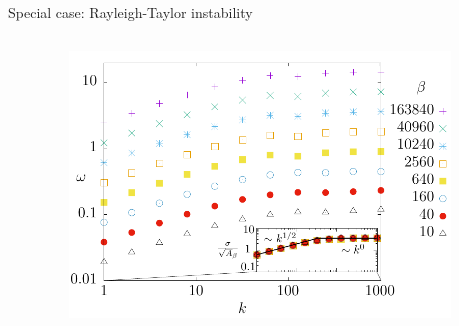 \documentclass[final]{beamer} %
\begin{document}
\begin{frame}[t]
\begin{columns}[t]
\begin{column}{0.34\paperwidth}
    \end{column}
    
  \end{columns}

  \begin{block}{Special case: Rayleigh-Taylor instability}
    \begin{columns}[t]
      \begin{column}{0.3\paperwidth}

      \end{column}

      \begin{column}{0.3\paperwidth}
          \begin{figure}
            \includegraphics[width=0.3\paperwidth]{RT_dispersion.pdf}
          \end{figure}
      \end{column}

      \begin{column}{0.3\paperwidth}

      \end{column}
    \end{columns}
  \end{block}
\end{frame}
\end{document}

